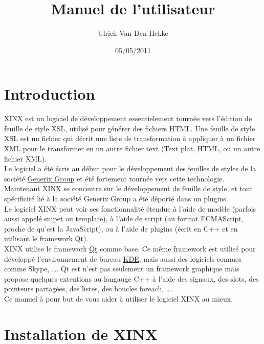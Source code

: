 \documentclass[a4paper,10pt,twoside,titlepage,onecolumn]{book}
\author{Ulrich Van Den Hekke}
\date{05/05/2011}
\title{Manuel de l'utilisateur}
\begin{document}
  
\maketitle

\tableofcontents {}

\chapter{Introduction}

XINX est un logiciel de développement essentielement tournée vers l'édition de feuille de style XSL, utilisé pour générer des fichiers HTML. 
Une feuille de style XSL est un fichier qui décrit une liste de transformation à appliquer à un fichier XML pour le transformer en un autre fichier text (Text plat, HTML, ou un autre fichier XML).
\\

Le logiciel a été écris au début pour le développement des feuilles de styles de la société \href{http://www.generixgroup.com/}{Generix Group} et été fortement tournée vers cette technologie. Maintenant XINX se concentre sur le développement de feuille de style, et tout spécificité lié à la société Generix Group a été déporté dans un plugins.
\\

Le logiciel XINX peut voir ses fonctionnalité étendue à l'aide de modèle (parfois aussi appelé snipet ou template), à l'aide de script (au format ECMAScript, proche de qu'est la JavaScript), ou à l'aide de plugins (écrit en C++ et en utilisant le framework Qt).
\\

XINX utilise le framework \href{http://qt.nokia.com}{Qt} comme base. Ce même framework est utilisé pour développé l'environnement de bureau \href{htpp://ww.kde.org}{KDE}, mais aussi des logiciels connues comme Skype, \ldots. Qt est n'est pas seulement un framework graphique mais propose quelques extentions au langauge C++ à l'aide des signaux, des slots, des pointeurs partagées, des listes, des boucles foreach, \ldots.
\\

Ce manuel à pour but de vous aider à utiliser le logiciel XINX au mieux. 

\chapter{Installation de XINX}
\end{document}
